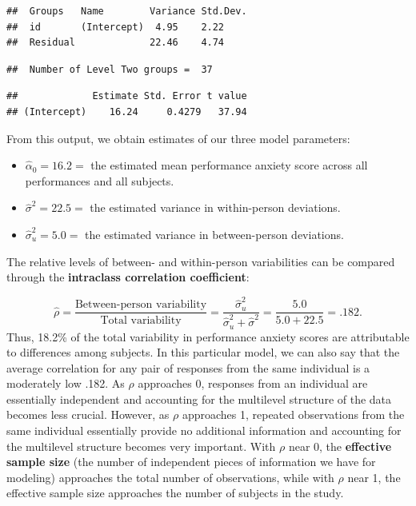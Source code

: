 \documentclass[
]{krantz}
\providecommand{\tightlist}{%
  \setlength{\itemsep}{0pt}\setlength{\parskip}{0pt}}
\begin{document}
\begin{verbatim}
##  Groups   Name        Variance Std.Dev.
##  id       (Intercept)  4.95    2.22    
##  Residual             22.46    4.74
\end{verbatim}

\begin{verbatim}
##  Number of Level Two groups =  37
\end{verbatim}

\begin{verbatim}
##             Estimate Std. Error t value
## (Intercept)    16.24     0.4279   37.94
\end{verbatim}

From this output, we obtain estimates of our three model parameters:

\begin{itemize}
\tightlist
\item
  \(\hat{\alpha}_{0}=16.2=\) the estimated mean performance anxiety score across all performances and all subjects.
\item
  \(\hat{\sigma}^2=22.5=\) the estimated variance in within-person deviations.
\item
  \(\hat{\sigma}_{u}^{2}=5.0=\) the estimated variance in between-person deviations.
\end{itemize}

The relative levels of between- and within-person variabilities can be compared through the \textbf{intraclass correlation coefficient}: 

\begin{equation*}
\hat{\rho}=\frac{\textrm{Between-person variability}}{\textrm{Total variability}} = \frac{\hat{\sigma}_{u}^{2}}{\hat{\sigma}_{u}^{2}+\hat{\sigma}^2} = \frac{5.0}{5.0+22.5} = .182.
\end{equation*}
Thus, 18.2\% of the total variability in performance anxiety scores are attributable to differences among subjects. In this particular model, we can also say that the average correlation for any pair of responses from the same individual is a moderately low .182. As \(\rho\) approaches 0, responses from an individual are essentially independent and accounting for the multilevel structure of the data becomes less crucial. However, as \(\rho\) approaches 1, repeated observations from the same individual essentially provide no additional information and accounting for the multilevel structure becomes very important. With \(\rho\) near 0, the \textbf{effective sample size}  (the number of independent pieces of information we have for modeling) approaches the total number of observations, while with \(\rho\) near 1, the effective sample size approaches the number of subjects in the study.
\end{document}
